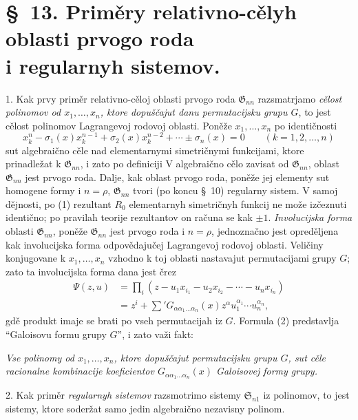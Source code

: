 \documentclass[11pt]{article}
\providecommand{\Ssys}{\mathfrak{S}}
\providecommand{\Gdom}{\mathfrak{G}}
\begin{document}
\section*{\S\ 13. Priměry relativno-cělyh oblasti prvogo roda\\ i regularnyh sistemov.}

1. Kak prvy priměr relativno-cěloj oblasti prvogo roda $\Gdom_{nn}$ razsmatrjamo {\itshape cělost polinomov od $x_1,\ldots,x_n$, ktore dopuščajut danu permutacijsku grupu $G$}, to jest cělost polinomov Lagrangevoj rodovoj oblasti. Poněže $x_1,\ldots,x_n$ po identičnosti
\begin{equation}
  x_k^n-\sigma_1(x)x_k^{n-1}+\sigma_2(x)x_k^{n-2}+\cdots\pm\sigma_n(x)=0
  \qquad(k=1,2,\ldots,n)
\tag{1}
\end{equation}
sut algebraično cěle nad elementarnymi simetričnymi funkcijami, ktore prinadležat k $\Gdom_{nn}$, i zato po definiciji V algebraično cělo zavisat od $\Gdom_{nn}$, oblast $\Gdom_{nn}$ jest prvogo roda. Dalje, kak oblast prvogo roda, poněže jej elementy sut homogene formy i $n=\rho$, $\Gdom_{nn}$ tvori (po koncu \S\ 10) regularny sistem. V samoj dějnosti, po (1) rezultant $R_0$ elementarnyh simetričnyh funkcij ne može izčeznuti identično; po pravilah teorije rezultantov on računa se kak $\pm1$. {\itshape Involucijska forma} oblasti $\Gdom_{nn}$, poněže $\Gdom_{nn}$ jest prvogo roda i $n=\rho$, jednoznačno jest opreděljena kak involucijska forma odpovědajučej Lagrangevoj rodovoj oblasti. Veličiny konjugovane k $x_1,\ldots,x_n$ vzhodno k toj oblasti nastavajut permutacijami grupy $G$; zato ta involucijska forma dana jest črez
\begin{equation}
\begin{aligned}
  \Psi(z,u)&=\prod_i
  (z-u_1x_{i_1}-u_2x_{i_2}-\cdots-u_nx_{i_n})\\
  &=z^i+\sum{}'G_{\alpha\alpha_1\ldots\alpha_n}(x)
  z^\alpha u_1^{\alpha_1}\cdots u_n^{\alpha_n},
\end{aligned}
\tag{2}
\end{equation}
gdě produkt imaje se brati po vseh permutacijah iz $G$. Formula (2) predstavlja ``Galoisovu formu grupy $G$'', i zato važi fakt:

{\itshape Vse polinomy od $x_1,\ldots,x_n$, ktore dopuščajut permutacijsku grupu $G$, sut cěle racionalne kombinacije koeficientov $G_{\alpha\alpha_1\ldots\alpha_n}(x)$ Galoisovej formy grupy.}

2. Kak priměr {\itshape regularnyh sistemov} razsmotrimo sistemy $\Ssys_{n1}$ iz polinomov, to jest sistemy, ktore soderžat samo jedin algebraično nezavisny polinom.
\end{document}
